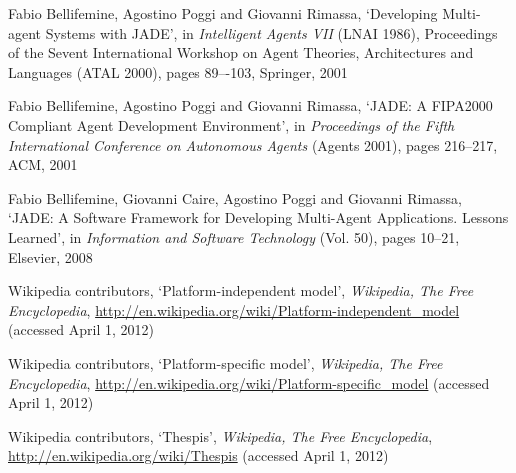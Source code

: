 \begin{thebibliography}{99}
Fabio Bellifemine, Agostino Poggi and Giovanni Rimassa,
`Developing Multi-agent Systems with JADE',
in \textit{Intelligent Agents VII} (LNAI 1986),
Proceedings of the Sevent International Workshop on Agent Theories, Architectures and Languages (ATAL 2000),
pages 89–-103,
Springer, 2001

Fabio Bellifemine, Agostino Poggi and Giovanni Rimassa,
`JADE: A FIPA2000 Compliant Agent Development Environment',
in \textit{Proceedings of the Fifth International Conference on Autonomous Agents} (Agents 2001),
pages 216--217,
ACM, 2001

Fabio Bellifemine, Giovanni Caire, Agostino Poggi and Giovanni Rimassa,
`JADE: A Software Framework for Developing Multi-Agent Applications. Lessons Learned',
in \textit{Information and Software Technology} (Vol. 50),
pages 10--21,
Elsevier, 2008


Wikipedia contributors,
`Platform-independent model',
\textit{Wikipedia, The Free Encyclopedia},
\url{http://en.wikipedia.org/wiki/Platform-independent_model} (accessed April 1, 2012)

Wikipedia contributors,
`Platform-specific model',
\textit{Wikipedia, The Free Encyclopedia},
\url{http://en.wikipedia.org/wiki/Platform-specific_model} (accessed April 1, 2012)

Wikipedia contributors,
`Thespis',
\textit{Wikipedia, The Free Encyclopedia},
\url{http://en.wikipedia.org/wiki/Thespis} (accessed April 1, 2012)



\end{thebibliography}